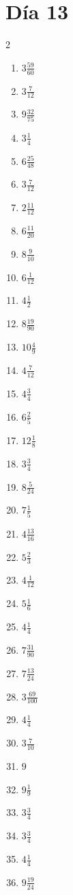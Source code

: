\documentclass[12pt]{article}
\begin{document}
\section*{Día 13}
\begin{multicols}{2}\begin{enumerate}
\item $ 3 \frac{59}{60} $
\item $ 3 \frac{7}{12} $
\item $ 9 \frac{32}{75} $
\item $ 3 \frac{1}{4} $
\item $ 6 \frac{25}{48} $
\item $ 3 \frac{7}{12} $
\item $ 2 \frac{11}{12} $
\item $ 6 \frac{11}{20} $
\item $ 8 \frac{9}{10} $
\item $ 6 \frac{1}{12} $
\item $ 4 \frac{1}{2} $
\item $ 8 \frac{19}{90} $
\item $ 10 \frac{4}{9} $
\item $ 4 \frac{7}{12} $
\item $ 4 \frac{3}{4} $
\item $ 6 \frac{2}{5} $
\item $ 12 \frac{1}{8} $
\item $ 3 \frac{3}{4} $
\item $ 8 \frac{5}{24} $
\item $ 7 \frac{1}{5} $
\item $ 4 \frac{13}{16} $
\item $ 5 \frac{2}{3} $
\item $ 4 \frac{1}{12} $
\item $ 5 \frac{1}{6} $
\item $ 4 \frac{1}{4} $
\item $ 7 \frac{31}{90} $
\item $ 7 \frac{13}{24} $
\item $ 3 \frac{69}{100} $
\item $ 4 \frac{1}{4} $
\item $ 3 \frac{7}{10} $
\item $ 9 $
\item $ 9 \frac{1}{9} $
\item $ 3 \frac{3}{4} $
\item $ 3 \frac{3}{4} $
\item $ 4 \frac{1}{4} $
\item $ 9 \frac{19}{24} $

\end{enumerate}
\end{multicols}
\end{document}
